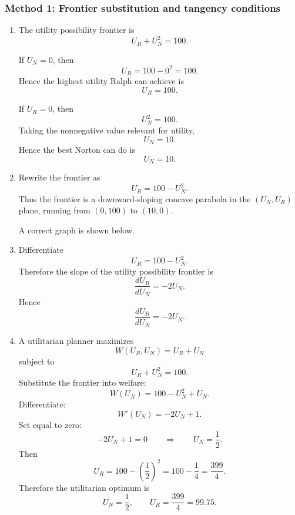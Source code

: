 \documentclass[12pt]{article}
\begin{document}
\subsubsection{Method 1: Frontier substitution and tangency conditions}

\begin{enumerate}[label=(\alph*)]
    \item
    The utility possibility frontier is
    \[
    U_R + U_N^2 = 100.
    \]

    If $U_N=0$, then
    \[
    U_R = 100-0^2=100.
    \]
    Hence the highest utility Ralph can achieve is
    \[
    \boxed{U_R=100.}
    \]

    If $U_R=0$, then
    \[
    U_N^2=100.
    \]
    Taking the nonnegative value relevant for utility,
    \[
    U_N=10.
    \]
    Hence the best Norton can do is
    \[
    \boxed{U_N=10.}
    \]

    \item
    Rewrite the frontier as
    \[
    U_R = 100-U_N^2.
    \]
    Thus the frontier is a downward-sloping concave parabola in the $(U_N,U_R)$ plane, running from $(0,100)$ to $(10,0)$.

    A correct graph is shown below.

    \begin{center}
    \end{center}

    \item
    Differentiate
    \[
    U_R = 100-U_N^2.
    \]
    Therefore the slope of the utility possibility frontier is
    \[
    \frac{dU_R}{dU_N}=-2U_N.
    \]
    Hence
    \[
    \boxed{\frac{dU_R}{dU_N}=-2U_N.}
    \]

    \item
    A utilitarian planner maximizes
    \[
    W(U_R,U_N)=U_R+U_N
    \]
    subject to
    \[
    U_R+U_N^2=100.
    \]
    Substitute the frontier into welfare:
    \[
    W(U_N)=100-U_N^2+U_N.
    \]
    Differentiate:
    \[
    W'(U_N)=-2U_N+1.
    \]
    Set equal to zero:
    \[
    -2U_N+1=0
    \qquad\Longrightarrow\qquad
    U_N=\frac12.
    \]
    Then
    \[
    U_R=100-\left(\frac12\right)^2 = 100-\frac14=\frac{399}{4}.
    \]
    Therefore the utilitarian optimum is
    \[
    \boxed{U_N=\frac12,\qquad U_R=\frac{399}{4}=99.75.}
    \]


\end{enumerate}
\end{document}
